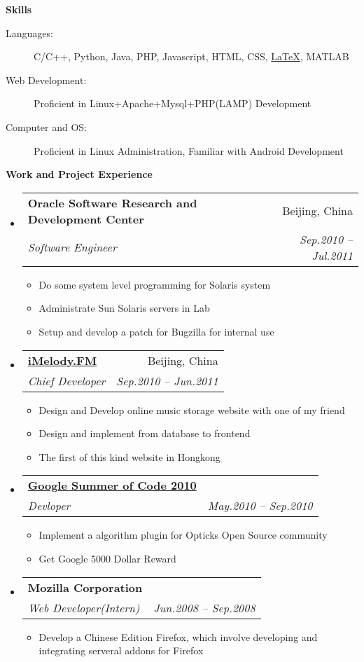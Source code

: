 \documentclass[letterpaper,11pt]{article}
\makeatletter
\newcommand{\resitem}[1]{\item #1 \vspace{-2pt}}
\newcommand{\resheading}[1]{{\large \colorbox{mygrey}{\begin{minipage}{\textwidth}{\textbf{#1 \vphantom{p\^{E}}}}\end{minipage}}}}
\newcommand{\ressubheading}[4]{
\begin{tabular*}{6.5in}{l@{\extracolsep{\fill}}r}
		\textbf{#1} & #2 \\
		\textit{#3} & \textit{#4} \\
\end{tabular*}\vspace{-6pt}}
\makeatother
\begin{document}
\resheading{{Skills}}
	\begin{description}
        \item[Languages:] { \footnotesize C/C++, Python, Java, PHP, Javascript, HTML, CSS, \href{http://www.latex-project.org/}{\LaTeX}, MATLAB}
        \item[Web Development:] {Proficient in Linux+Apache+Mysql+PHP(LAMP) Development}
		\item[Computer and OS:] { \footnotesize Proficient in Linux Administration, Familiar with Android Development}
		
	\end{description} %

\resheading{Work and Project Experience}
	\begin{itemize}
		\item 
			\ressubheading{Oracle Software Research and Development Center}{Beijing, China}{Software Engineer}{Sep.2010 -- Jul.2011}
            { \footnotesize
				\begin{itemize}
					\resitem{Do some system level programming for Solaris system}
					\resitem{Administrate Sun Solaris servers in Lab}
					\resitem{Setup and develop a patch for Bugzilla for internal use}
				\end{itemize}
			}
		\item
			\ressubheading{\href{http://www.imelody.fm}{iMelody.FM}}{Beijing, China}{Chief Developer}{Sep.2010 -- Jun.2011}
				{ \footnotesize
				\begin{itemize}
					\resitem{Design and Develop online music storage website with one of my friend }
					\resitem{Design and implement from database to frontend}
                    \resitem{The first of this kind website in Hongkong}
				\end{itemize}
          		}
		\item 
            \ressubheading{\href{http://code.google.com/soc/}{Google Summer of Code 2010}}{}{Devloper}{May.2010 -- Sep.2010}
				{ \footnotesize
				\begin{itemize}
					\resitem{Implement a algorithm plugin for Opticks Open Source community}
                    \resitem{Get Google 5000 Dollar Reward}
				\end{itemize}
				}

		\item			
			\ressubheading{Mozilla Corporation}{}{Web Developer(Intern)}{Jun.2008 -- Sep.2008}
				{ \footnotesize				
				\begin{itemize}
					\item Develop a Chinese Edition Firefox, which involve developing and integrating serveral addons for Firefox
				\end{itemize}
				}

	\end{itemize}  %
\end{document}
